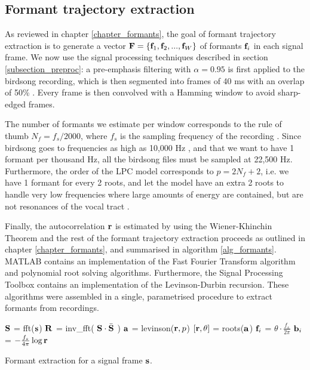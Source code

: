 \documentclass[../main.tex]{subfiles}
\begin{document}
\subsection{Formant trajectory extraction} \label{section_impformants}
As reviewed in chapter \ref{chapter_formants}, the goal of formant trajectory extraction is to generate a vector $\mathbf{F} = \{\mathbf{f}_1, \mathbf{f}_2, ..., \mathbf{f}_W\}$ of formants $\mathbf{f}_i$ in each signal frame. We now use the signal processing techniques described in section \ref{subsection_preproc}: a pre-emphasis filtering with $\alpha = 0.95$ is first applied to the birdsong recording, which is then segmented into frames of 40 ms with an overlap of 50\% \cite{Stowell2014}. Every frame is then convolved with a Hamming window to avoid sharp-edged frames. 
\par The number of formants we estimate per window corresponds to the rule of thumb $N_f = f_s / 2000$, where $f_s$ is the sampling frequency of the recording \cite{markel1976}. Since birdsong goes to frequencies as high as 10,000 Hz \cite{Marler2004}, and that we want to have 1 formant per thousand Hz, all the birdsong files must be sampled at 22,500 Hz. Furthermore, the order of the LPC model corresponds to $p = 2N_f + 2$, i.e. we have 1 formant for every 2 roots, and let the model have an extra 2 roots to handle very low frequencies where large amounts of energy are contained, but are not resonances of the vocal tract \cite{Benesty}. 
\par Finally, the autocorrelation $\mathbf{r}$ is estimated by using the Wiener-Khinchin Theorem and the rest of the formant trajectory extraction proceeds as outlined in chapter \ref{chapter_formants}, and summarised in algorithm \ref{alg_formants}. MATLAB contains an implementation of the Fast Fourier Transform algorithm and polynomial root solving algorithms. Furthermore, the Signal Processing Toolbox contains an implementation of the Levinson-Durbin recursion. These algorithms were assembled in a single, parametrised procedure to extract formants from recordings.

\begin{algorithm}
\begin{algorithmic}[1]
\State $\mathbf{S}$ = fft($\mathbf{s}$)
\State $\mathbf{R}$ = inv\_fft( $\mathbf{S} \cdot \bar{\mathbf{S}}$ )
\State $\mathbf{a}$ = levinson($\mathbf{r}, p$)
\State $\left[\mathbf{r}, \theta\right]$ = roots($\mathbf{a}$)
\State $\mathbf{f}_i$ = $\theta \cdot \frac{f_s}{2\pi}$
\State $\mathbf{b}_i$ = $-\frac{f_s}{4\pi}\log{\mathbf{r}}$
\EndFunction
\caption{Formant extraction for a signal frame $\mathbf{s}$.}\label{alg_formants}
\end{algorithmic}
\end{algorithm}
\end{document}
